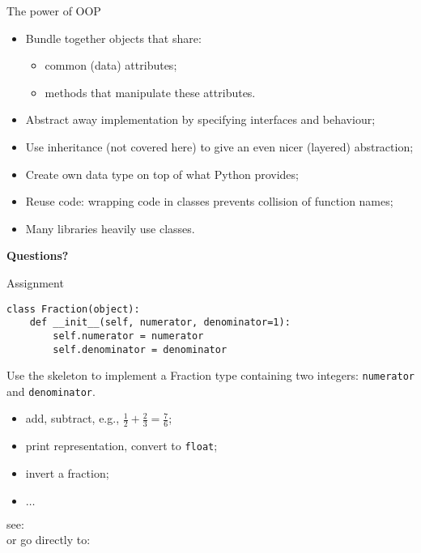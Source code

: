 \documentclass{beamer}
\begin{document}
\begin{frame}{The power of OOP}
\begin{itemize}
\item \textcolor{pms280_compl}{Bundle} together objects that share:
\begin{itemize}
\item common (data) attributes;
\item methods that manipulate these attributes.
\end{itemize}

\item \textcolor{pms280_compl}{Abstract away} implementation by
specifying interfaces and behaviour;

\item Use \textcolor{pms280_compl}{inheritance} (not covered here)
to give an even nicer (layered) abstraction;

\item \textcolor{pms280_compl}{Create} own data type on top of what
Python provides;

\item \textcolor{pms280_compl}{Reuse} code: wrapping code in classes
prevents collision of function names;

\item Many \textcolor{pms280_compl}{libraries} heavily use classes.
\end{itemize}

\vfill

\begin{center}
\textcolor{pms280}{\Large \textbf{Questions?}}
\end{center}
\end{frame}

\begin{frame}[fragile]{Assignment}
\begin{verbatim}
class Fraction(object):
    def __init__(self, numerator, denominator=1):
        self.numerator = numerator
        self.denominator = denominator
\end{verbatim}

\bigskip

Use the skeleton to implement a \textcolor{pms280_compl}{Fraction} type
containing two integers: \texttt{numerator} and
\texttt{denominator}.

\begin{itemize}
\item add, subtract, e.g., $\frac{1}{2} + \frac{2}{3} = \frac{7}{6}$;
\item print representation, convert to \texttt{float};
\item invert a fraction;
\item $\ldots$
\end{itemize}

\bigskip

see:  \\
or go directly to: \textcolor{pms280_compl}{}
\end{frame}
\end{document}
